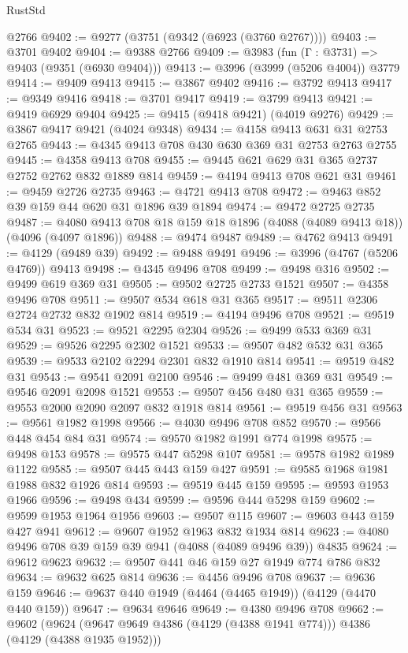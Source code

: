\begin{lexlean}{RustStd}
\begin{coremodule}
    @2766
@9402 := @9277 (@3751 (@9342 (@6923 (@3760 @2767))))
@9403 := @3701 @9402
@9404 := @9388 @2766
@9409 := @3983 (fun (Γ : @3731) => @9403 (@9351 (@6930 @9404)))
@9413 := @3996 (@3999 (@5206 @4004)) @3779
@9414 := @9409 @9413
@9415 := @3867 @9402
@9416 := @3792 @9413
@9417 := @9349 @9416
@9418 := @3701 @9417
@9419 := @3799 @9413
@9421 := @9419 @6929 @9404
@9425 := @9415 (@9418 @9421) (@4019 @9276)
@9429 := @3867 @9417 @9421 (@4024 @9348)
@9434 := @4158 @9413 @631 @31 @2753 @2765
@9443 := @4345 @9413 @708 @430 @630 @369 @31 @2753 @2763 @2755
@9445 := @4358 @9413 @708
@9455 := @9445 @621 @629 @31 @365 @2737 @2752 @2762 @832 @1889 @814
@9459 := @4194 @9413 @708 @621 @31
@9461 := @9459 @2726 @2735
@9463 := @4721 @9413 @708
@9472 := @9463 @852 @39 @159 @44 @620 @31 @1896 @39 @1894
@9474 := @9472 @2725 @2735
@9487 := @4080 @9413 @708 @18 @159 @18 @1896 (@4088 (@4089 @9413 @18)) (@4096 (@4097 @1896))
@9488 := @9474 @9487
@9489 := @4762 @9413
@9491 := @4129 (@9489 @39)
@9492 := @9488 @9491
@9496 := @3996 (@4767 (@5206 @4769)) @9413
@9498 := @4345 @9496 @708
@9499 := @9498 @316
@9502 := @9499 @619 @369 @31
@9505 := @9502 @2725 @2733 @1521
@9507 := @4358 @9496 @708
@9511 := @9507 @534 @618 @31 @365
@9517 := @9511 @2306 @2724 @2732 @832 @1902 @814
@9519 := @4194 @9496 @708
@9521 := @9519 @534 @31
@9523 := @9521 @2295 @2304
@9526 := @9499 @533 @369 @31
@9529 := @9526 @2295 @2302 @1521
@9533 := @9507 @482 @532 @31 @365
@9539 := @9533 @2102 @2294 @2301 @832 @1910 @814
@9541 := @9519 @482 @31
@9543 := @9541 @2091 @2100
@9546 := @9499 @481 @369 @31
@9549 := @9546 @2091 @2098 @1521
@9553 := @9507 @456 @480 @31 @365
@9559 := @9553 @2000 @2090 @2097 @832 @1918 @814
@9561 := @9519 @456 @31
@9563 := @9561 @1982 @1998
@9566 := @4030 @9496 @708 @852
@9570 := @9566 @448 @454 @84 @31
@9574 := @9570 @1982 @1991 @774 @1998
@9575 := @9498 @153
@9578 := @9575 @447 @5298 @107
@9581 := @9578 @1982 @1989 @1122
@9585 := @9507 @445 @443 @159 @427
@9591 := @9585 @1968 @1981 @1988 @832 @1926 @814
@9593 := @9519 @445 @159
@9595 := @9593 @1953 @1966
@9596 := @9498 @434
@9599 := @9596 @444 @5298 @159
@9602 := @9599 @1953 @1964 @1956
@9603 := @9507 @115
@9607 := @9603 @443 @159 @427 @941
@9612 := @9607 @1952 @1963 @832 @1934 @814
@9623 := @4080 @9496 @708 @39 @159 @39 @941 (@4088 (@4089 @9496 @39)) @4835
@9624 := @9612 @9623
@9632 := @9507 @441 @46 @159 @27 @1949 @774 @786 @832
@9634 := @9632 @625 @814
@9636 := @4456 @9496 @708
@9637 := @9636 @159
@9646 := @9637 @440 @1949 (@4464 (@4465 @1949)) (@4129 (@4470 @440 @159))
@9647 := @9634 @9646
@9649 := @4380 @9496 @708
@9662 := @9602
    (@9624 (@9647 @9649 @4386 (@4129 (@4388 @1941 @774))) @4386 (@4129 (@4388 @1935 @1952)))

\end{coremodule}
\end{lexlean}
